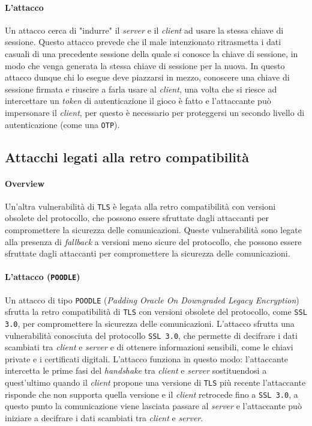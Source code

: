         \paragraph{L'attacco} Un attacco cerca di "indurre" il \textit{server} e il \textit{client} ad usare la stessa chiave di sessione. Questo attacco prevede che il male intenzionato ritrasmetta i dati casuali di una precedente sessione della quale si conosce la chiave di sessione, in modo che venga generata la stessa chiave di sessione per la nuova. In questo attacco dunque chi lo esegue deve piazzarsi in mezzo, conoscere una chiave di sessione firmata e riuscire a farla usare al \textit{client}, una volta che si riesce ad intercettare un \textit{token} di autenticazione il gioco è fatto e l'attaccante può impersonare il \textit{client}, per questo è necessario per proteggersi un secondo livello di autenticazione (come una \texttt{OTP}).
    \subsection{Attacchi legati alla retro compatibilità}
        \paragraph{Overview} Un'altra vulnerabilità di \texttt{TLS} è legata alla retro compatibilità con versioni obsolete del protocollo, che possono essere sfruttate dagli attaccanti per compromettere la sicurezza delle comunicazioni. Queste vulnerabilità sono legate alla presenza di \textit{fallback} a versioni meno sicure del protocollo, che possono essere sfruttate dagli attaccanti per compromettere la sicurezza delle comunicazioni.
        \paragraph{L'attacco (\texttt{POODLE})} Un attacco di tipo \texttt{POODLE} (\textit{Padding Oracle On Downgraded Legacy Encryption}) sfrutta la retro compatibilità di \texttt{TLS} con versioni obsolete del protocollo, come \texttt{SSL 3.0}, per compromettere la sicurezza delle comunicazioni. L'attacco sfrutta una vulnerabilità conosciuta del protocollo \texttt{SSL 3.0}, che permette di decifrare i dati scambiati tra \textit{client} e \textit{server} e di ottenere informazioni sensibili, come le chiavi private e i certificati digitali. L'attacco funziona in questo modo: l'attaccante intercetta le prime fasi del \textit{handshake} tra \textit{client} e \textit{server} sostituendosi a quest'ultimo quando il \textit{client} propone una versione di \texttt{TLS} più recente l'attaccante risponde che non supporta quella versione e il \textit{client} retrocede fino a \texttt{SSL 3.0}, a questo punto la comunicazione viene lasciata passare al \textit{server} e l'attaccante può iniziare a decifrare i dati scambiati tra \textit{client} e \textit{server}.
